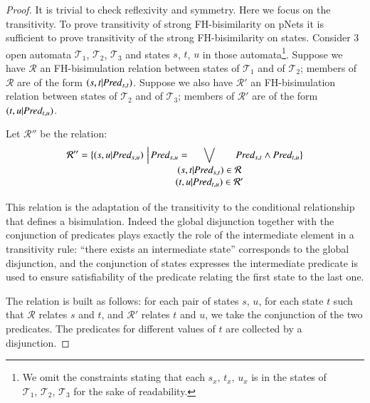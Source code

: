 \documentclass{elsarticle}
\begin{document}
              \begin{proof}
       	It is trivial to check reflexivity and symmetry. Here we focus on the
       	transitivity. 
       	To prove transitivity of strong FH-bisimilarity on pNets it is sufficient to 
       	prove 
       	transitivity of the strong FH-bisimilarity on states. Consider 3 open automata 
       	$\mathcal{T}_1$, $\mathcal{T}_2$, $\mathcal{T}_3$ and states $s$, $t$, $u$ 
       	in those 
       	automata\footnote{We omit the constraints stating that each $s_x,\,t_x,\,u_x$ is 
       	in the 
       	states of 
       		$\mathcal{T}_1,\,\mathcal{T}_2,\,\mathcal{T}_3$ for the sake of readability.}.
       	Suppose we have $\mathcal{R}$ an FH-bisimulation relation between states of 
       	$\mathcal{T}_1$ and of  $\mathcal{T}_2$; members of $\mathcal{R}$ are of the form 
       	$(s,t|\Pred_{s,t})$.
       	Suppose we also  have $\mathcal{R}'$ an FH-bisimulation relation between states 
       	of 
       	$\mathcal{T}_2$ and of  $\mathcal{T}_3$; members of $\mathcal{R}'$ are of the 
       	form 
       	$(t,u|\Pred_{t,u})$.
       	
       	Let $\mathcal{R}''$ be the relation: 
       	\[\mathcal{R}'' = 
       	\{(s,u|\Pred_{s,u})\,\,\Big|\,\Pred_{s,u}=\hspace{-0.7cm}\bigvee_{\begin{array}{c}       		
       		(s,t|\Pred_{s,t})\in\mathcal{R}\\ (t,u|\Pred_{t,u})\in\mathcal{R}' 	
       		\end{array}
       }\hspace{-0.5cm}\Pred_{s,t}\land\Pred_{t,u}\}\]

This relation is the adaptation of the transitivity to the conditional relationship that 
defines a bisimulation. Indeed the global disjunction together with the conjunction of 
predicates plays exactly the role of the intermediate element in a transitivity rule: 
``there exists an intermediate state'' corresponds to the global disjunction, and the 
conjunction of states expresses the intermediate predicate is used to ensure 
satisfiability of the predicate relating the first state to the last one.
       	
       	The relation is built as follows: for each pair of states $s$, $u$, for each 
       	state 
       	$t$ such that $\mathcal{R}$ relates $s$ and $t$, and $\mathcal{R}'$ relates 
       	$t$ 
       	and $u$, we take the conjunction of the two predicates. The predicates for 
       	different 
       	values of $t$ are collected by a disjunction. 
       	

\end{proof}
\end{document}
